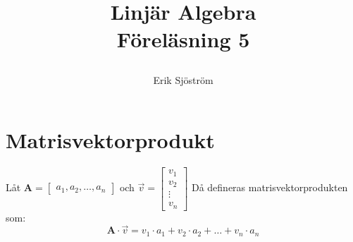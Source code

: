 
\title{
	 Linjär Algebra\\
	 Föreläsning 5
    \author{Erik Sjöström}
}

\maketitle

\section{Matrisvektorprodukt} %
\label{sec:matrisvektorprodukt}
\begin{Def}
    Låt $\mathbf{A} = \begin{bmatrix} a_1,a_2, \dots, a_n \end{bmatrix}$ och $\vec{v} = \begin{bmatrix} v_1\\v_2\\ \vdots \\v_n \end{bmatrix}$ Då defineras matrisvektorprodukten som:
    \[
        \mathbf{A} \cdot \vec{v} = v_1 \cdot a_1 + v_2 \cdot a_2 + \dots + v_n \cdot a_n
    \]
\end{Def}
